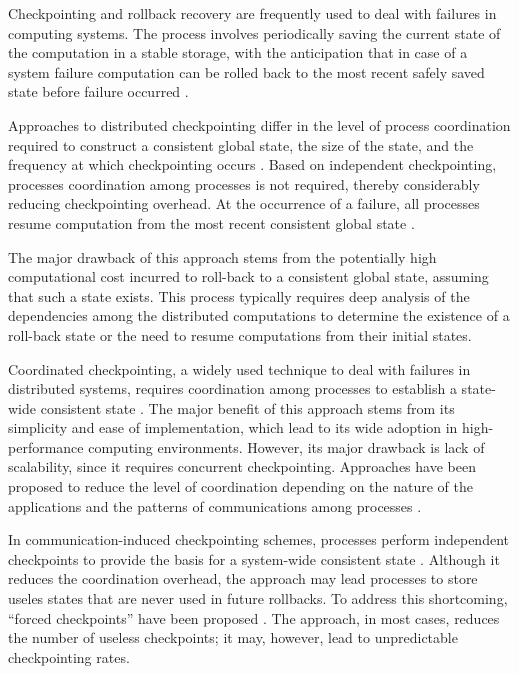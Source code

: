 Checkpointing and rollback recovery are frequently used to deal with
failures in computing systems. The process involves periodically
saving the current state of the computation in a stable storage, with
the anticipation that in case of a system failure computation can be
rolled back to the most recent safely saved state before failure
occurred \cite{agarwal_ics_2004,chandy_trans_1985,daly_fgcs_2006,elnozahy_cs_2002,elnozahy_dsc_2004,geist_reli_1988,yudan_pdp_2008,naksinehaboon_ccg_2008,oldfield_msst_2007,oliner_ics_2006}.

Approaches to distributed checkpointing differ in the level of process
coordination required to construct a consistent global state, the size
of the state, and the frequency at which checkpointing occurs
\cite{plank_ftc_1999,strom_tran_1985}. Based on independent checkpointing, 
processes coordination among processes is not required, thereby
considerably reducing checkpointing overhead. At the occurrence of a
failure, all processes resume computation from the most recent
consistent global state \cite{bhargava_rds_1988,chandy_trans_1985,koo_acm_1986,pattabiraman_dsc_2005}.

The major drawback of this approach stems from the potentially high
computational cost incurred to roll-back to a consistent global state,
assuming that such a state exists. This process typically requires
deep analysis of the dependencies among the distributed computations
to determine the existence of a roll-back state or the need to resume
computations from their initial states.

Coordinated checkpointing, a widely used technique to deal with
failures in distributed systems, requires coordination among processes
to establish a state-wide consistent state
\cite{chandy_trans_1985}. The major benefit of this approach stems
from its simplicity and ease of implementation, which lead to its wide
adoption in high-performance computing environments. However, its
major drawback is lack of scalability, since it requires concurrent
checkpointing. Approaches have been proposed to reduce the level of
coordination depending on the nature of the applications and the
patterns of communications among processes \cite{koo_acm_1986}.

In communication-induced checkpointing schemes, processes perform
independent checkpoints to provide the basis for a system-wide
consistent state \cite{alvisi_ftc_1999,briatico_rdsd_1984}. Although
it reduces the coordination overhead, the approach may lead processes
to store useles states that are never used in future rollbacks. To
address this shortcoming, ``forced checkpoints'' have been proposed
\cite{helary_rds_1997}. The approach, in most cases, reduces the number of useless
checkpoints; it may, however, lead to unpredictable checkpointing
rates.

